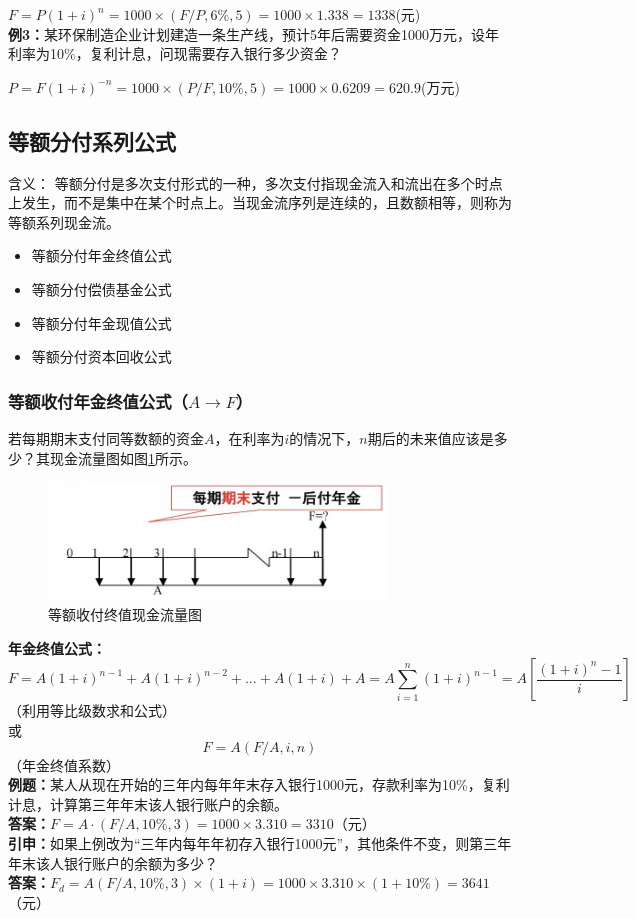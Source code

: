 \documentclass[12pt, a4paper, oneside]{ctexbook}
\begin{document}
$F=P(1+i)^n=1000 \times (F/P,6\%,5)=1000 \times 1.338=1338$(元)\\
\textbf{例3：}某环保制造企业计划建造一条生产线，预计5年后需要资金1000万元，设年利率为10\%，复利计息，问现需要存入银行多少资金？

$P=F(1+i)^{-n}=1000 \times (P/F,10\%,5)=1000 \times 0.6209=620.9$(万元)

\subsection{等额分付系列公式}

含义：
等额分付是多次支付形式的一种，多次支付指现金流入和流出在多个时点上发生，而不是集中在某个时点上。当现金流序列是连续的，且数额相等，则称为等额系列现金流。
\begin{itemize}
    \item 等额分付年金终值公式
    \item 等额分付偿债基金公式
    \item 等额分付年金现值公式
    \item 等额分付资本回收公式
\end{itemize}

\subsubsection{等额收付年金终值公式（$A \to F$）}

若每期期末支付同等数额的资金$A$，在利率为$i$的情况下，$n$期后的未来值应该是多少？其现金流量图如图\ref{fig:7}所示。

\begin{figure}[H]
    \centering
    \includegraphics[width=0.8\textwidth]{image/等额收付终值现金流量图.jpg}
    \caption{等额收付终值现金流量图}
    \label{fig:7}
\end{figure}

\textbf{年金终值公式：}
$$F=A(1+i)^{n-1}+A(1+i)^{n-2}+\mbox{…}+A(1+i)+A=A \sum_{i=1}^{n} (1+i)^{n-1}=A[\frac{(1+i)^n-1}{i}]$$（利用等比级数求和公式）\\
或
$$F = A(F / A, i, n)$$（年金终值系数）\\
\textbf{例题：}某人从现在开始的三年内每年年末存入银行1000元，存款利率为10\%，复利计息，计算第三年年末该人银行账户的余额。\\
\textbf{答案：}$F=A \cdot (F/A,10\%,3)=1000 \times 3.310 = 3310$（元）\\
\textbf{引申：}如果上例改为“三年内每年年初存入银行1000元”，其他条件不变，则第三年年末该人银行账户的余额为多少？\\
\textbf{答案：}$F_d=A(F/A,10\%,3) \times (1+i)=1000 \times 3.310 \times (1+10\%)=3641$（元）\\
\end{document}
